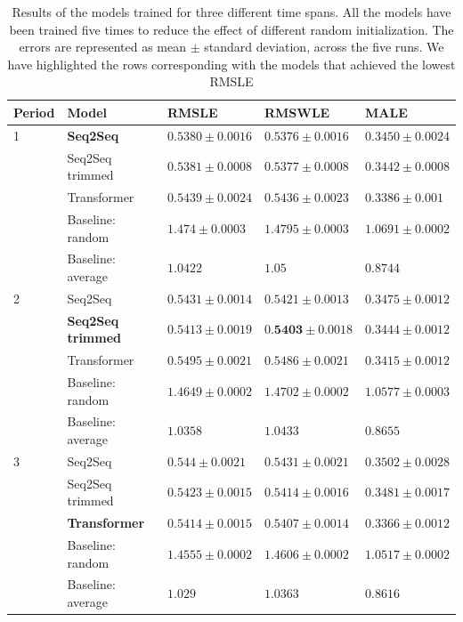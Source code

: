 \documentclass{elsarticle}
\begin{document}
	\begin{table}[!h]
		\footnotesize
		\caption{Results of the models trained for three different time spans. All the models have been trained five times to reduce the effect of different random initialization. The errors are represented as mean $\pm$ standard deviation, across the five runs. We have highlighted the rows corresponding with the models that achieved the lowest RMSLE}
		\label{tab:results}
		\centering
	\begin{tabular}{lllll}
		\hline
		Period & Model             & RMSLE                 & RMSWLE                & MALE                  \\ \hline
		1      & \textbf{Seq2Seq}           & $ \mathbf{0.5380 \pm 0.0016} $  & $ \mathbf{0.5376 \pm 0.0016 }$ & $  \mathbf{0.3450 \pm 0.0024}$  \\
		       & Seq2Seq trimmed   & $ 0.5381 \pm 0.0008 $ & $ 0.5377 \pm 0.0008 $ & $ 0.3442 \pm 0.0008 $ \\
		       & Transformer       & $ 0.5439 \pm 0.0024 $ & $ 0.5436 \pm 0.0023 $ & $ 0.3386 \pm 0.001 $  \\
		       & Baseline: random  & $ 1.474 \pm 0.0003 $  & $ 1.4795 \pm 0.0003 $ & $ 1.0691 \pm 0.0002 $ \\
		       & Baseline: average & $ 1.0422$             & $ 1.05$               & $ 0.8744$             \\ \hline
		2      & Seq2Seq           & $ 0.5431 \pm 0.0014 $ & $ 0.5421 \pm 0.0013 $ & $ 0.3475 \pm 0.0012 $ \\
		       & \textbf{Seq2Seq trimmed }  & $ \mathbf{0.5413 \pm 0.0019} $ & $ 0.\mathbf{5403 \pm 0.0018 }$ & $ \mathbf{0.3444 \pm 0.0012} $ \\
		       & Transformer       & $ 0.5495 \pm 0.0021 $ & $ 0.5486 \pm 0.0021 $ & $ 0.3415 \pm 0.0012 $ \\
		       & Baseline: random  & $ 1.4649 \pm 0.0002 $ & $ 1.4702 \pm 0.0002 $ & $ 1.0577 \pm 0.0003 $ \\
		       & Baseline: average & $ 1.0358$             & $ 1.0433$             & $ 0.8655$             \\ \hline
		3      & Seq2Seq           & $ 0.544 \pm 0.0021 $  & $ 0.5431 \pm 0.0021 $ & $ 0.3502 \pm 0.0028 $ \\
		       & Seq2Seq trimmed   & $ 0.5423 \pm 0.0015 $ & $ 0.5414 \pm 0.0016 $ & $ 0.3481 \pm 0.0017 $ \\
		       & \textbf{Transformer}       & $ \mathbf{0.5414 \pm 0.0015} $ & $ \mathbf{0.5407 \pm 0.0014} $ & $ \mathbf{0.3366 \pm 0.0012} $ \\
		       & Baseline: random  & $ 1.4555 \pm 0.0002 $ & $ 1.4606 \pm 0.0002 $ & $ 1.0517 \pm 0.0002 $ \\
		       & Baseline: average & $ 1.029$              & $ 1.0363 $            & $ 0.8616$             \\ \hline
	\end{tabular}
    \end{table}
\end{document}
